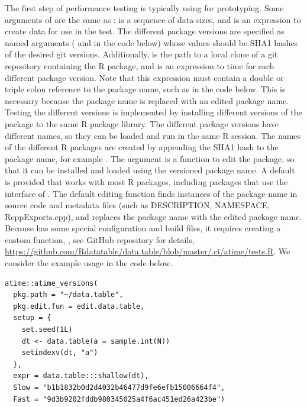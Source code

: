 The first step of performance testing is typically using  for prototyping.
Some arguments of  are the same as :  is a sequence of data sizes, and  is an expression to create data for use in the test. 
The different package versions are specified as named arguments ( and  in the code below) whose values should be SHA1 hashes of the desired git versions.
Additionally,  is the path to a local clone of a git repository containing the R package, and  is an expression to time for each different package version.
Note that this expression must contain a double or triple colon reference to the package name, such as  in the code below.
This is necessary because the package name is replaced with an edited package name.
Testing the different versions is implemented by installing different versions of the package to the same R package library.
The different package versions have different names, so they can be loaded and run in the same R session.
The names of the different R packages are created by appending the SHA1 hash to the package name, for example .
The  argument is a function to edit the package, so that it can be installed and loaded using the versioned package name.
A default  is provided that works with most R packages, including packages that use the  interface of \citet{Rcpp}.
The default editing function finds instances of the package name in source code and metadata files (such as DESCRIPTION, NAMESPACE, RcppExports.cpp), and replaces the package name with the edited package name.
Because  has some special configuration and build files, it requires creating a custom function, , see GitHub repository for details, \url{https://github.com/Rdatatable/data.table/blob/master/.ci/atime/tests.R}. 
We consider the example usage in the code below.
\begin{Schunk}
\begin{verbatim}
atime::atime_versions(
  pkg.path = "~/data.table",
  pkg.edit.fun = edit.data.table, 
  setup = {
    set.seed(1L)
    dt <- data.table(a = sample.int(N))
    setindexv(dt, "a")
  },
  expr = data.table:::shallow(dt),
  Slow = "b1b1832b0d2d4032b46477d9fe6efb15006664f4", 
  Fast = "9d3b9202fddb980345025a4f6ac451ed26a423be")
\end{verbatim}
\end{Schunk}
